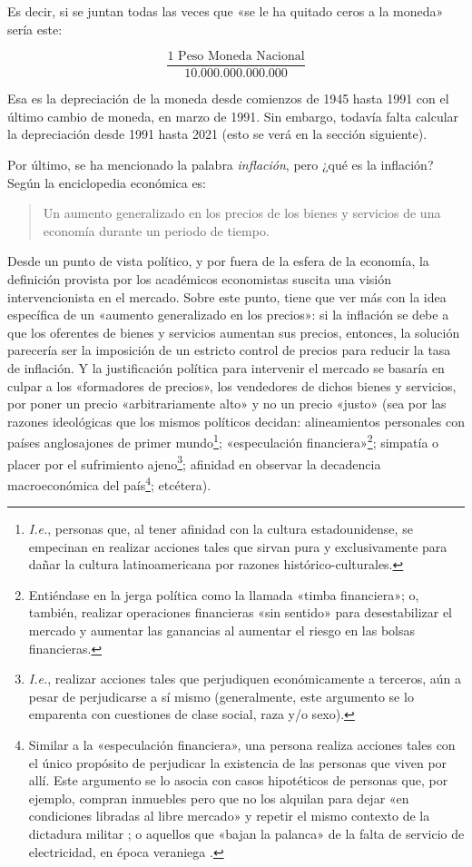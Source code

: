 \documentclass[12pt,a4paper,twoside]{book}
\begin{document}
Es decir, si se juntan todas las veces que «se le ha quitado ceros a la moneda» sería este:

\[
\dfrac{1 \text{ Peso Moneda Nacional}}{10.000.000.000.000}
\]

Esa es la depreciación de la moneda desde comienzos de 1945 hasta 1991 con el último cambio de moneda, en marzo de 1991. Sin embargo, todavía falta calcular la depreciación desde 1991 hasta 2021 (esto se verá en la sección siguiente).

Por último, se ha mencionado la palabra \textit{inflación}, pero ¿qué es la inflación? Según la enciclopedia económica es:

\begin{quote}
Un aumento generalizado en los precios de los bienes y servicios de una economía durante un periodo de tiempo. \cite{epedia:inflac}
\end{quote}

Desde un punto de vista político, y por fuera de la esfera de la economía, la definición provista por los académicos economistas suscita una visión intervencionista en el mercado. Sobre este punto, tiene que ver más con la idea específica de un «aumento generalizado en los precios»: si la inflación se debe a que los oferentes de bienes y servicios aumentan sus precios, entonces, la solución parecería ser la imposición de un estricto control de precios para reducir la tasa de inflación. Y la justificación política para intervenir el mercado se basaría en culpar a los «formadores de precios», los vendedores de dichos bienes y servicios, por poner un precio «arbitrariamente alto» y no un precio «justo» (sea por las razones ideológicas que los mismos políticos decidan: alineamientos personales con países anglosajones de primer mundo\footnote{\textit{I.e.}, personas que, al tener afinidad con la cultura estadounidense, se empecinan en realizar acciones tales que sirvan pura y exclusivamente para dañar la cultura latinoamericana por razones histórico-culturales.}; «especulación financiera»\footnote{Entiéndase en la jerga política como la llamada «timba financiera»; o, también, realizar operaciones financieras «sin sentido» para desestabilizar el mercado y aumentar las ganancias al aumentar el riesgo en las bolsas financieras.}; simpatía o placer por el sufrimiento ajeno\footnote{\textit{I.e.}, realizar acciones tales que perjudiquen económicamente a terceros, aún a pesar de perjudicarse a sí mismo (generalmente, este argumento se lo emparenta con cuestiones de clase social, raza y/o sexo).}; afinidad en observar la decadencia macroeconómica del país\footnote{Similar a la «especulación financiera», una persona realiza acciones tales con el único propósito de perjudicar la existencia de las personas que viven por allí. Este argumento se lo asocia con casos hipotéticos de personas que, por ejemplo, compran inmuebles pero que no los alquilan para dejar «en condiciones libradas al libre mercado» y repetir el mismo contexto de la dictadura militar \cite{vivienda-ociosa}; o aquellos que «bajan la palanca» de la falta de servicio de electricidad, en época veraniega \cite{corte-luz-2012}.}; etcétera).
\end{document}
